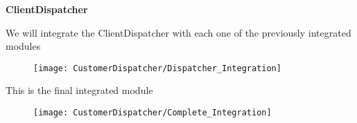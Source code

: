 \begin{Large}
\textbf{ClientDispatcher}
\end{Large}

We will integrate the ClientDispatcher with each one of the previously integrated modules
\begin{figure}[H]
\centering
\texttt{[image: CustomerDispatcher/Dispatcher\_Integration]}
\end{figure}

This is the final integrated module
\begin{figure}[H]
\texttt{[image: CustomerDispatcher/Complete\_Integration]}
\end{figure}
